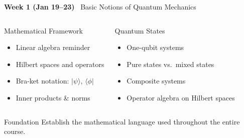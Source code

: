 \documentclass[aspectratio=169,12pt]{beamer}
\newcommand{\ket}[1]{|#1\rangle}
\newcommand{\bra}[1]{\langle#1|}
\newcommand{\week}[1]{\textcolor{qgold}{\textbf{#1}}}
\begin{document}
\begin{frame}{\week{Week 1 (Jan 19--23)} \ Basic Notions of Quantum Mechanics}
  \begin{columns}[T]
      \begin{block}{Mathematical Framework}
        \begin{itemize}
          \item Linear algebra reminder
          \item Hilbert spaces and operators
          \item Bra-ket notation: $\ket{\psi}$, $\bra{\phi}$
          \item Inner products \& norms
        \end{itemize}
      \end{block}
      \begin{block}{Quantum States}
        \begin{itemize}
          \item One-qubit systems
          \item Pure states vs.\ mixed states
          \item Composite systems
          \item Operator algebra on Hilbert spaces
        \end{itemize}
      \end{block}
  \end{columns}
  \vspace{8pt}
  \begin{alertblock}{Foundation}
    Establish the mathematical language used throughout
    the entire course.
  \end{alertblock}
\end{frame}
\end{document}
